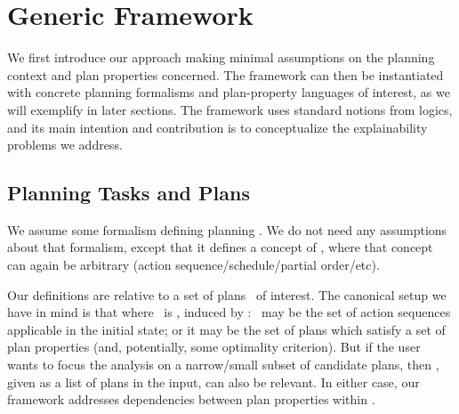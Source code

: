 \section{Generic Framework}
\label{framework}

We first introduce our approach making minimal assumptions on the
planning context and plan properties concerned. The framework can then
be instantiated with concrete planning formalisms and plan-property
languages of interest, as we will exemplify in later sections. The
framework uses standard notions from logics, and its main intention
and contribution is to conceptualize the explainability problems we
address.




\subsection{Planning Tasks and Plans}

We assume some formalism defining planning  \task. We
do not need any assumptions about that formalism, except that it
defines a concept of  \plan, where that concept can
again be arbitrary (action sequence/schedule/partial order/etc). 

Our definitions are relative to a set of plans \plans\ of
interest. The canonical setup we have in mind is that where \plans\ is
, induced by \task: \plans\ may be the set of action
sequences applicable in the initial state; or it may be the set of
plans which satisfy a set of  plan properties (and,
potentially, some optimality criterion). But if the user wants to
focus the analysis on a narrow/small subset of candidate plans, then
 \plans, given as a list of plans in the input, can
also be relevant. In either case, our framework addresses dependencies
between  plan properties within \plans.
%
%





